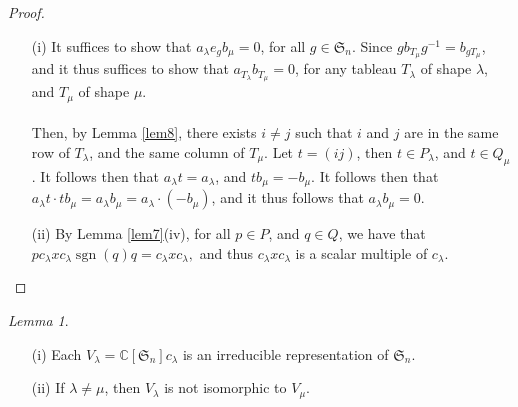 \documentclass[a4paper]{report}
\theoremstyle{definition}
\theoremstyle{remark}
\theoremstyle{proposition}
\theoremstyle{conjecture}
\theoremstyle{lemma}
\newtheorem{lemma}{Lemma}
\theoremstyle{corollary}
\theoremstyle{exercise}
\theoremstyle{example}
\newcommand{\C}{\mathbb{C}}
\newcommand{\on}{\operatorname}
\begin{document}
\begin{proof}
   \leavevmode
   \begin{itemize}
       \item[(i)] It suffices to show that 
           $a_\lambda e_g b_\mu = 0$, for all $g \in \mathfrak{S}_n$.
           Since $gb_{T_\mu}g^{-1} = b_{gT_\mu}$, and it thus suffices
           to show that $a_{T_\lambda}b_{T_\mu} = 0$, for 
           any tableau $T_\lambda$ of shape $\lambda$, and $T_\mu$ of 
           shape $\mu$.\\\\
           Then, by Lemma \ref{lem8}, there exists $i\neq j$ such that 
           $i$ and $j$ are in the same row of $T_\lambda$, and the 
           same column of $T_\mu$. Let $t = (ij)$, then $t\in P_\lambda$,
           and $t\in Q_\mu$. It follows then that 
           $a_\lambda t = a_\lambda$, and $tb_\mu = -b_\mu$. 
           It follows then that $a_\lambda t \cdot t b_\mu = a_\lambda b_\mu = a_\lambda\cdot (-b_\mu)$,
           and it thus follows that $a_\lambda b_\mu = 0$.
       \item[(ii)] By Lemma \ref{lem7}(iv), for all $p\in P$, and $q\in Q$,
           we have that $pc_\lambda x c_\lambda \on{sgn}(q)q = c_\lambda xc_\lambda,$
           and thus $c_\lambda x c_\lambda$ is a scalar multiple of $c_\lambda$.
   \end{itemize}
\end{proof}

\begin{lemma}
    \leavevmode
    \begin{itemize}
        \item[(i)] Each $V_\lambda = \C[\mathfrak{S}_n]c_\lambda$ is an 
            irreducible representation of $\mathfrak{S}_n$.
        \item[(ii)] If $\lambda\neq \mu$, then $V_\lambda$ is not isomorphic
            to $V_\mu$.
    \end{itemize}
\end{lemma}
\end{document}
